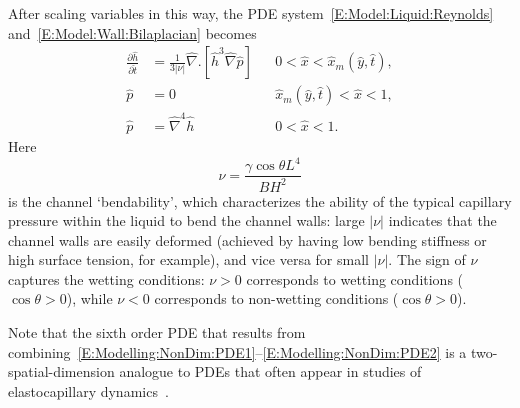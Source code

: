 \documentclass{jfm}
\newcommand{\ddp}[2]{\frac{\partial #1}{\partial #2}}
\newcommand{\bendability}{\nu}
\begin{document}
After scaling variables in this way, the PDE system~\eqref{E:Model:Liquid:Reynolds} and~\eqref{E:Model:Wall:Bilaplacian} becomes
\begin{align}
\ddp{\hat{h}}{\hat{t}} &=\frac{1}{3|\nu|}\hat{\nabla}. \left[\hat{h}^3\hat{\nabla}\hat{p}  \right] & & 0 <  \hat{x} < \hat{x}_m(\hat{y},\hat{t}),\label{E:Modelling:NonDim:PDE1}\\
  \hat{p}&=0 & &
\hat{x}_m(\hat{y},\hat{t}) < \hat{x} < 1,\label{E:Modelling:NonDim:PDE2}\\
\hat{p} &=\hat{\nabla}^4 \hat{h}& &0 < \hat{x} < 1.\label{E:Modelling:NonDim:PDE3}
\end{align}
Here
\begin{equation}\label{E:Modelling:NonDim:Bendability}
\bendability = \frac{\gamma \cos \theta L^4}{B H^2}
\end{equation}
is the channel `bendability', which characterizes the ability of the typical capillary pressure within the liquid to bend the channel walls: large $|\nu|$ indicates that the channel walls are easily deformed (achieved by having low bending stiffness or high surface tension, for example), and vice versa for small $|\nu|$. The sign of $\nu$ captures the wetting conditions: $\nu > 0$ corresponds to wetting conditions ($\cos \theta >0$), while $\nu < 0$ corresponds to non-wetting conditions ($\cos \theta >0$).

Note that the sixth order PDE that results from combining~\eqref{E:Modelling:NonDim:PDE1}--\eqref{E:Modelling:NonDim:PDE2} is a two-spatial-dimension analogue to PDEs that often appear in studies of elastocapillary dynamics~\citep[see][for example]{Flitton2004EJApplMech, Duprat2011JFM, Aristoff2011IntJNonlinMech}.
\end{document}
